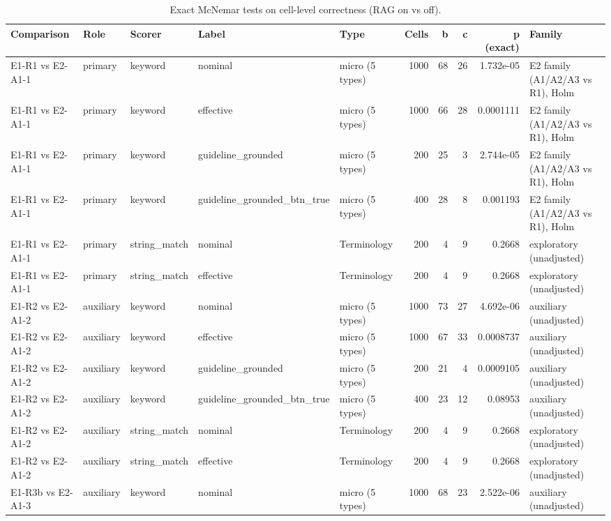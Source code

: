 \begin{table}[t]
\centering
\small
\caption{Exact McNemar tests on cell-level correctness (RAG on vs off).}
\label{tab:e7-mcnemar}
\begin{tabular}{lllllrrrrl}
\toprule
Comparison & Role & Scorer & Label & Type & Cells & b & c & p (exact) & Family \\
\midrule
E1-R1 vs E2-A1-1 & primary & keyword & nominal & micro (5 types) & 1000 & 68 & 26 & 1.732e-05 & E2 family (A1/A2/A3 vs R1), Holm \\
E1-R1 vs E2-A1-1 & primary & keyword & effective & micro (5 types) & 1000 & 66 & 28 & 0.0001111 & E2 family (A1/A2/A3 vs R1), Holm \\
E1-R1 vs E2-A1-1 & primary & keyword & guideline\_grounded & micro (5 types) & 200 & 25 & 3 & 2.744e-05 & E2 family (A1/A2/A3 vs R1), Holm \\
E1-R1 vs E2-A1-1 & primary & keyword & guideline\_grounded\_btn\_true & micro (5 types) & 400 & 28 & 8 & 0.001193 & E2 family (A1/A2/A3 vs R1), Holm \\
E1-R1 vs E2-A1-1 & primary & string\_match & nominal & Terminology & 200 & 4 & 9 & 0.2668 & exploratory (unadjusted) \\
E1-R1 vs E2-A1-1 & primary & string\_match & effective & Terminology & 200 & 4 & 9 & 0.2668 & exploratory (unadjusted) \\
E1-R2 vs E2-A1-2 & auxiliary & keyword & nominal & micro (5 types) & 1000 & 73 & 27 & 4.692e-06 & auxiliary (unadjusted) \\
E1-R2 vs E2-A1-2 & auxiliary & keyword & effective & micro (5 types) & 1000 & 67 & 33 & 0.0008737 & auxiliary (unadjusted) \\
E1-R2 vs E2-A1-2 & auxiliary & keyword & guideline\_grounded & micro (5 types) & 200 & 21 & 4 & 0.0009105 & auxiliary (unadjusted) \\
E1-R2 vs E2-A1-2 & auxiliary & keyword & guideline\_grounded\_btn\_true & micro (5 types) & 400 & 23 & 12 & 0.08953 & auxiliary (unadjusted) \\
E1-R2 vs E2-A1-2 & auxiliary & string\_match & nominal & Terminology & 200 & 4 & 9 & 0.2668 & exploratory (unadjusted) \\
E1-R2 vs E2-A1-2 & auxiliary & string\_match & effective & Terminology & 200 & 4 & 9 & 0.2668 & exploratory (unadjusted) \\
E1-R3b vs E2-A1-3 & auxiliary & keyword & nominal & micro (5 types) & 1000 & 68 & 23 & 2.522e-06 & auxiliary (unadjusted) \\

\end{tabular}
\end{table}
